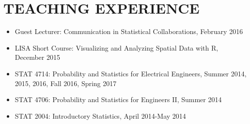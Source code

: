 \documentclass[10pt]{article}
\begin{document}
\section*{TEACHING EXPERIENCE}
\begin{itemize}
\item Guest Lecturer: Communication in Statistical Collaborations, February 2016
\item LISA Short Course: Visualizing and Analyzing Spatial Data with R, December 2015
\item STAT 4714: Probability and Statistics for Electrical Engineers, Summer 2014, 2015, 2016, Fall 2016, Spring 2017
\item STAT 4706: Probability and Statistics for Engineers II, Summer 2014
\item STAT 2004: Introductory Statistics, April 2014-May 2014
\end{itemize}
\end{document}

